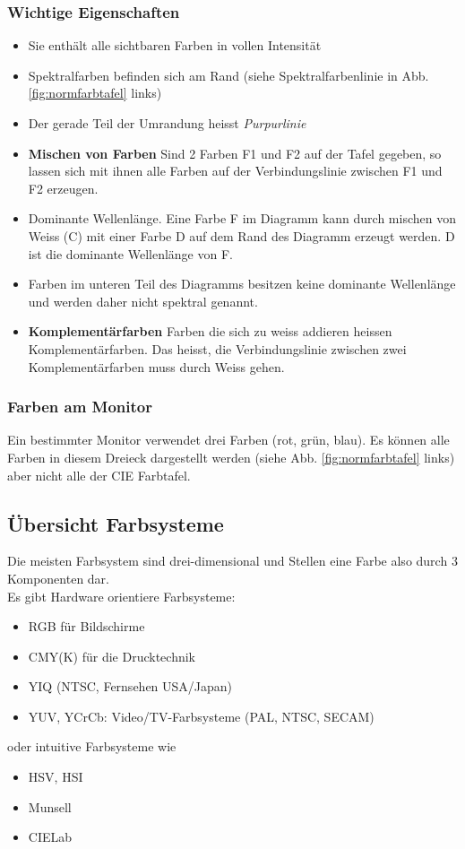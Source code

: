 \subsubsection{Wichtige Eigenschaften}
\begin{itemize}[leftmargin=1cm]
    \item Sie enthält alle sichtbaren Farben in vollen Intensität
    \item Spektralfarben befinden sich am Rand (siehe Spektralfarbenlinie in Abb. \ref{fig:normfarbtafel} links)
    \item Der gerade Teil der Umrandung heisst \textit{Purpurlinie}
    \item \textbf{Mischen von Farben} Sind 2 Farben F1 und F2 auf der Tafel gegeben, so lassen sich mit ihnen alle Farben auf der Verbindungslinie zwischen F1 und F2 erzeugen.
    \item Dominante Wellenlänge. Eine Farbe F im Diagramm kann durch mischen von Weiss (C) mit einer Farbe D auf dem Rand des Diagramm erzeugt werden. D ist die dominante Wellenlänge von F.
    \item Farben im unteren Teil des Diagramms besitzen keine dominante Wellenlänge und werden daher nicht spektral genannt.
    \item \textbf{Komplementärfarben} Farben die sich zu weiss addieren heissen Komplementärfarben. Das heisst, die Verbindungslinie zwischen zwei Komplementärfarben muss durch Weiss gehen.
\end{itemize}
\subsubsection{Farben am Monitor}
Ein bestimmter Monitor verwendet drei Farben (rot, grün, blau). Es können alle Farben in diesem Dreieck dargestellt werden (siehe Abb. \ref{fig:normfarbtafel} links) aber nicht alle der CIE Farbtafel. 


\subsection{Übersicht Farbsysteme}
Die meisten Farbsystem sind drei-dimensional und Stellen eine Farbe also durch 3 Komponenten dar.\\
Es gibt Hardware orientiere Farbsysteme:
\begin{itemize}[leftmargin=1cm]
    \item RGB für Bildschirme
    \item CMY(K) für die Drucktechnik
    \item YIQ (NTSC, Fernsehen USA/Japan)
    \item YUV, YCrCb: Video/TV-Farbsysteme (PAL, NTSC, SECAM)
\end{itemize}
\noindent
oder intuitive Farbsysteme wie
\begin{itemize}[leftmargin=1cm]
    \item HSV, HSI
    \item Munsell
    \item CIELab
\end{itemize}




